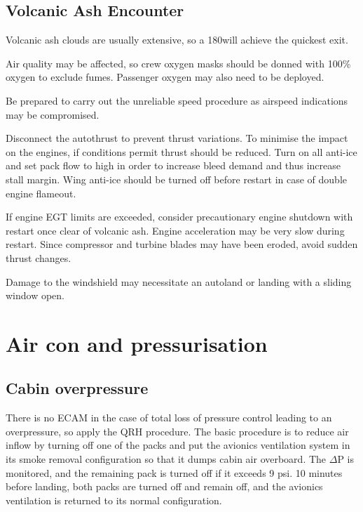 \documentclass[a5paper,11pt,twoside]{book}
\newcommand{\multicite}[1]{
  \nopagebreak
  \noindent{\footnotesize\color{blue}{[ #1 ]}}
}
\begin{document}
\section{Volcanic Ash Encounter}

Volcanic ash clouds are usually extensive, so a 180\textdegree{ }will achieve
the quickest exit.

Air quality may be affected, so crew oxygen masks should be donned with 100\%
oxygen to exclude fumes. Passenger oxygen may also need to be deployed.

Be prepared to carry out the unreliable speed procedure as airspeed indications
may be compromised.

Disconnect the autothrust to prevent thrust variations. To minimise the impact
on the engines, if conditions permit thrust should be reduced. Turn on all
anti-ice and set pack flow to high in order to increase bleed demand and thus
increase stall margin. Wing anti-ice should be turned off before restart in case
of double engine flameout.

If engine EGT limits are exceeded, consider precautionary engine shutdown with
restart once clear of volcanic ash. Engine acceleration may be very slow during
restart. Since compressor and turbine blades may have been eroded, avoid sudden
thrust changes.

Damage to the windshield may necessitate an autoland or landing with a sliding
window open.

\multicite{QRH~AEP.MISC, FCOM~PRO.AEP.MISC, FCTM~PRO.AEP.MISC}

\chapter{Air con and pressurisation}

\section{Cabin overpressure}

There is no ECAM in the case of total loss of pressure control leading to an
overpressure, so apply the QRH procedure. The basic procedure is to reduce air
inflow by turning off one of the packs and put the avionics ventilation system
in its smoke removal configuration so that it dumps cabin air overboard. The
$\Delta$P is monitored, and the remaining pack is turned off if it exceeds 9
psi. 10 minutes before landing, both packs are turned off and remain off, and
the avionics ventilation is returned to its normal configuration.
\end{document}
